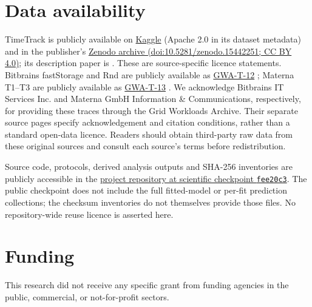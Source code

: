 \documentclass[a4paper,fleqn]{cas-dc}
\begin{document}
\section*{Data availability}

TimeTrack is publicly available on
\href{https://www.kaggle.com/datasets/abdelghanimeliani/open-air-interface-cicd-timeseries-dataset}{Kaggle}
(Apache 2.0 in its dataset metadata) and in the publisher's
\href{https://doi.org/10.5281/zenodo.15442251}{Zenodo archive
(doi:10.5281/zenodo.15442251; CC BY 4.0)}; its description paper is
\citet{Meliani2025TimeTrack}. These are source-specific licence statements.
Bitbrains fastStorage and Rnd are publicly available as
\href{https://atlarge-research.com/gwa-t-12/}{GWA-T-12}
\citep{Shen2015Bitbrains}; Materna T1--T3 are publicly available as
\href{https://atlarge-research.com/gwa-t-13/}{GWA-T-13}
\citep{Kohne2014FederatedCloudSim,Kohne2016SLAScheduling}.
We acknowledge Bitbrains IT Services Inc. and Materna GmbH Information
\& Communications, respectively, for providing these traces through the
Grid Workloads Archive. Their separate source pages specify acknowledgement
and citation conditions, rather than a standard open-data licence. Readers
should obtain third-party raw data from these original sources and consult
each source's terms before redistribution.

Source code, protocols, derived analysis outputs and SHA-256 inventories are
publicly accessible in the
\href{https://github.com/KADOUMAAbdelhak/TimeTrack-Forecasting-Framework/tree/fee20c316040c57b69ba12a193530c955b539771}{project repository at scientific checkpoint \texttt{fee20c3}}.
The public checkpoint does not include the full fitted-model or per-fit
prediction collections; the checksum inventories do not themselves provide
those files. No repository-wide reuse licence is asserted here.

\printcredits

\section*{Funding}

This research did not receive any specific grant from funding agencies in
the public, commercial, or not-for-profit sectors.




\end{document}
